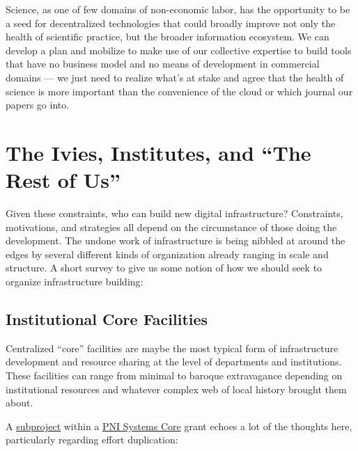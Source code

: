 Science, as one of few domains of non-economic labor, has the
opportunity to be a seed for decentralized technologies that could
broadly improve not only the health of scientific practice, but the
broader information ecosystem. We can develop a plan and mobilize to
make use of our collective expertise to build tools that have no
business model and no means of development in commercial domains --- we
just need to realize what's at stake and agree that the health of
science is more important than the convenience of the cloud or which journal our papers go
into.

\hypertarget{the-ivies-institutes-and-the-rest-of-us}{%
\section{The Ivies, Institutes, and ``The Rest of
Us''}\label{the-ivies-institutes-and-the-rest-of-us}}

Given these constraints, who can build new digital infrastructure?
Constraints, motivations, and strategies all depend on the circumstance
of those doing the development. The undone work of infrastructure is
being nibbled at around the edges by several different kinds of
organization already ranging in scale and structure. A short survey to
give us some notion of how we should seek to organize infrastructure
building:

\hypertarget{institutional-core-facilities}{%
\subsection{Institutional Core
Facilities}\label{institutional-core-facilities}}

Centralized ``core'' facilities are maybe the most typical form of
infrastructure development and resource sharing at the level of
departments and institutions. These facilities can range from minimal to
baroque extravagance depending on institutional resources and whatever
complex web of local history brought them about.

A
\href{https://reporter.nih.gov/project-details/9444124\#sub-Projects}{subproject}
within a
\href{https://projectreporter.nih.gov/project_info_details.cfm?aid=9444124}{PNI
Systems Core} grant echoes a lot of the thoughts here, particularly
regarding effort duplication:

